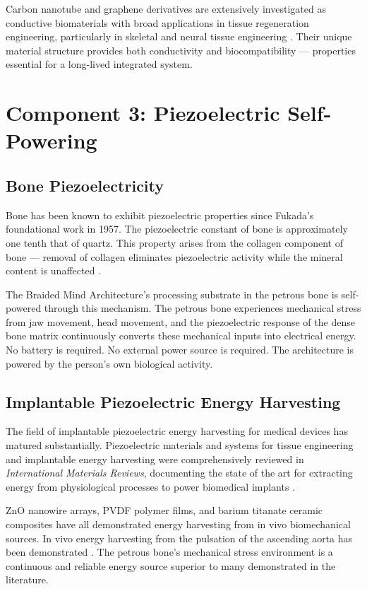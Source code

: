 \documentclass[12pt]{article}
\begin{document}
Carbon nanotube and graphene derivatives are extensively investigated as conductive biomaterials with broad applications in tissue regeneration engineering, particularly in skeletal and neural tissue engineering \cite{piezo_tissue_2024}. Their unique material structure provides both conductivity and biocompatibility --- properties essential for a long-lived integrated system.

\section{Component 3: Piezoelectric Self-Powering}

\subsection{Bone Piezoelectricity}

Bone has been known to exhibit piezoelectric properties since Fukada's foundational work in 1957. The piezoelectric constant of bone is approximately one tenth that of quartz. This property arises from the collagen component of bone --- removal of collagen eliminates piezoelectric activity while the mineral content is unaffected \cite{piezo_wearable_2025}.

The Braided Mind Architecture's processing substrate in the petrous bone is self-powered through this mechanism. The petrous bone experiences mechanical stress from jaw movement, head movement, and the piezoelectric response of the dense bone matrix continuously converts these mechanical inputs into electrical energy. No battery is required. No external power source is required. The architecture is powered by the person's own biological activity.

\subsection{Implantable Piezoelectric Energy Harvesting}

The field of implantable piezoelectric energy harvesting for medical devices has matured substantially. Piezoelectric materials and systems for tissue engineering and implantable energy harvesting were comprehensively reviewed in \textit{International Materials Reviews}, documenting the state of the art for extracting energy from physiological processes to power biomedical implants \cite{piezo_tissue_engineering_2022}.

ZnO nanowire arrays, PVDF polymer films, and barium titanate ceramic composites have all demonstrated energy harvesting from in vivo biomechanical sources. In vivo energy harvesting from the pulsation of the ascending aorta has been demonstrated \cite{piezo_implant_review_2024}. The petrous bone's mechanical stress environment is a continuous and reliable energy source superior to many demonstrated in the literature.
\end{document}
